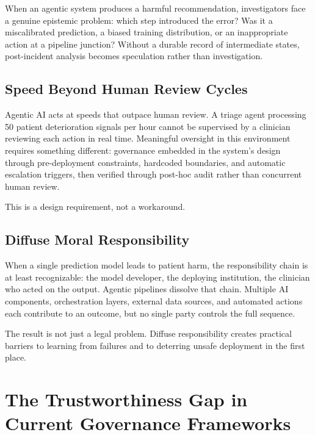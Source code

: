 \documentclass[12pt,a4paper]{article}
\begin{document}
When an agentic system produces a harmful recommendation,
investigators face a genuine epistemic problem: which step
introduced the error? Was it a miscalibrated prediction, a biased
training distribution, or an inappropriate action at a pipeline
junction? Without a durable record of intermediate states,
post-incident analysis becomes speculation rather than
investigation.

\subsection*{Speed Beyond Human Review Cycles}

Agentic AI acts at speeds that outpace human review. A triage
agent processing 50 patient deterioration signals per hour cannot
be supervised by a clinician reviewing each action in real time.
Meaningful oversight in this environment requires something
different: governance embedded in the system's design through
pre-deployment constraints, hardcoded boundaries, and automatic
escalation triggers, then verified through post-hoc audit rather
than concurrent human review.\cite{choudhury2020}

This is a design requirement, not a workaround.

\subsection*{Diffuse Moral Responsibility}

When a single prediction model leads to patient harm, the
responsibility chain is at least recognizable: the model
developer, the deploying institution, the clinician who acted on
the output. Agentic pipelines dissolve that chain. Multiple AI
components, orchestration layers, external data sources, and
automated actions each contribute to an outcome, but no single
party controls the full sequence.\cite{zuiderwijk2021}

The result is not just a legal problem. Diffuse responsibility
creates practical barriers to learning from failures and to
deterring unsafe deployment in the first place.

\section*{The Trustworthiness Gap in Current Governance
Frameworks}
\end{document}

